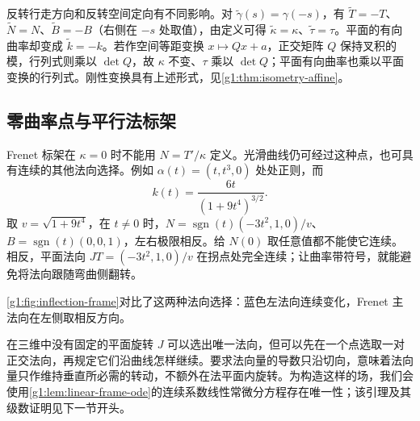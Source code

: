 反转行走方向和反转空间定向有不同影响。对 \(\widetilde\gamma(s)=\gamma(-s)\)，有 \(\widetilde T=-T\)、\(\widetilde N=N\)、\(\widetilde B=-B\)（右侧在 \(-s\) 处取值），由定义可得 \(\widetilde\kappa=\kappa\)、\(\widetilde\tau=\tau\)。平面的有向曲率却变成 \(\widetilde k=-k\)。若作空间等距变换 \(x\mapsto Qx+a\)，正交矩阵 \(Q\) 保持叉积的模，行列式则乘以 \(\det Q\)，故 \(\kappa\) 不变、\(\tau\) 乘以 \(\det Q\)；平面有向曲率也乘以平面变换的行列式。刚性变换具有上述形式，见\cref{g1:thm:isometry-affine}。

\subsection{零曲率点与平行法标架}
\label{g1:subsec:0701:04}

Frenet 标架在 \(\kappa=0\) 时不能用 \(N=T'/\kappa\) 定义。光滑曲线仍可经过这种点，也可具有连续的其他法向选择。例如 \(\alpha(t)=(t,t^3,0)\) 处处正则，而
\[
	k(t)=\frac{6t}{(1+9t^4)^{3/2}}.
\]
取 \(v=\sqrt{1+9t^4}\)，在 \(t\ne0\) 时，\(N=\operatorname{sgn}(t)(-3t^2,1,0)/v\)、\(B=\operatorname{sgn}(t)(0,0,1)\)，左右极限相反。给 \(N(0)\) 取任意值都不能使它连续。相反，平面法向 \(JT=(-3t^2,1,0)/v\) 在拐点处完全连续；让曲率带符号，就能避免将法向跟随弯曲侧翻转。

\ProseParagraphBreak

\cref{g1:fig:inflection-frame}对比了这两种法向选择：蓝色左法向连续变化，Frenet 主法向在左侧取相反方向。



在三维中没有固定的平面旋转 \(J\) 可以选出唯一法向，但可以先在一个点选取一对正交法向，再规定它们沿曲线怎样继续。要求法向量的导数只沿切向，意味着法向量只作维持垂直所必需的转动，不额外在法平面内旋转。为构造这样的场，我们会使用\cref{g1:lem:linear-frame-ode}的连续系数线性常微分方程存在唯一性；该引理及其级数证明见下一节开头。

